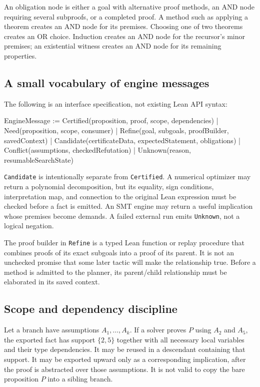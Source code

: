 \documentclass[11pt,a4paper]{article}
\newcommand{\code}[1]{\texttt{#1}}
\begin{document}
An obligation node is either a goal with alternative proof methods, an AND
node requiring several subproofs, or a completed proof. A method such as
applying a theorem creates an AND node for its premises. Choosing one of two
theorems creates an OR choice. Induction creates an AND node for the recursor's
minor premises; an existential witness creates an AND node for its remaining
properties.

\subsection{A small vocabulary of engine messages}
The following is an interface specification, not existing Lean API syntax:
\begin{Code}
EngineMessage :=
  Certified(proposition, proof, scope, dependencies)
| Need(proposition, scope, consumer)
| Refine(goal, subgoals, proofBuilder, savedContext)
| Candidate(certificateData, expectedStatement, obligations)
| Conflict(assumptions, checkedRefutation)
| Unknown(reason, resumableSearchState)
\end{Code}

\code{Candidate} is intentionally separate from \code{Certified}. A numerical
optimizer may return a polynomial decomposition, but its equality, sign
conditions, interpretation map, and connection to the original Lean expression
must be checked before a fact is emitted. An SMT engine may return a useful
implication whose premises become demands. A failed external run emits
\code{Unknown}, not a logical negation.

The proof builder in \code{Refine} is a typed Lean function or replay procedure
that combines proofs of its exact subgoals into a proof of its parent. It is not
an unchecked promise that some later tactic will make the relationship true.
Before a method is admitted to the planner, its parent/child relationship must
be elaborated in its saved context.

\subsection{Scope and dependency discipline}
Let a branch have assumptions $A_1,\ldots,A_k$. If a solver proves $P$ using
$A_2$ and $A_5$, the exported fact has support $\{2,5\}$ together with all
necessary local variables and their type dependencies. It may be reused in a
descendant containing that support. It may be exported upward only as a
corresponding implication, after the proof is abstracted over those assumptions.
It is not valid to copy the bare proposition $P$ into a sibling branch.
\end{document}
